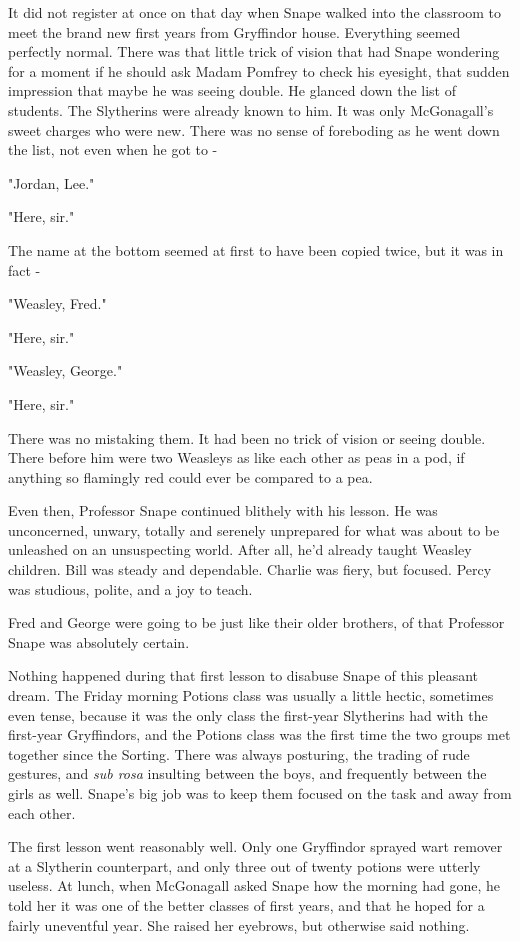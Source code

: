 It did not register at once on that day when Snape walked into the classroom to meet the brand new first years from Gryffindor house. Everything seemed perfectly normal. There was that little trick of vision that had Snape wondering for a moment if he should ask Madam Pomfrey to check his eyesight, that sudden impression that maybe he was seeing double. He glanced down the list of students. The Slytherins were already known to him. It was only McGonagall's sweet charges who were new. There was no sense of foreboding as he went down the list, not even when he got to -

"Jordan, Lee."

"Here, sir."

The name at the bottom seemed at first to have been copied twice, but it was in fact -

"Weasley, Fred."

"Here, sir."

"Weasley, George."

"Here, sir."

There was no mistaking them. It had been no trick of vision or seeing double. There before him were two Weasleys as like each other as peas in a pod, if anything so flamingly red could ever be compared to a pea.

Even then, Professor Snape continued blithely with his lesson. He was unconcerned, unwary, totally and serenely unprepared for what was about to be unleashed on an unsuspecting world. After all, he'd already taught Weasley children. Bill was steady and dependable. Charlie was fiery, but focused. Percy was studious, polite, and a joy to teach.

Fred and George were going to be just like their older brothers, of that Professor Snape was absolutely certain.

Nothing happened during that first lesson to disabuse Snape of this pleasant dream. The Friday morning Potions class was usually a little hectic, sometimes even tense, because it was the only class the first-year Slytherins had with the first-year Gryffindors, and the Potions class was the first time the two groups met together since the Sorting. There was always posturing, the trading of rude gestures, and \emph{sub rosa} insulting between the boys, and frequently between the girls as well. Snape's big job was to keep them focused on the task and away from each other.

The first lesson went reasonably well. Only one Gryffindor sprayed wart remover at a Slytherin counterpart, and only three out of twenty potions were utterly useless. At lunch, when McGonagall asked Snape how the morning had gone, he told her it was one of the better classes of first years, and that he hoped for a fairly uneventful year. She raised her eyebrows, but otherwise said nothing.


